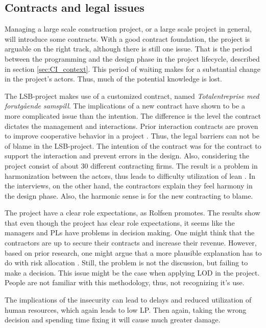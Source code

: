 \subsection{Contracts and legal issues}
Managing a large scale construction project, or a large scale project in general, will introduce some contracts. With a good contract foundation, the project is arguable on the right track, although there is still one issue. That is the period between the programming and the design phase in the project lifecycle, described in section \ref{sec:CI_context}. This period of waiting makes for a substantial change in the project's actors. Thus, much of the potential knowledge is lost. 

The LSB-project makes use of a customized contract, named \textit{Totalentreprise med forutgående samspill}. The implications of a new contract have shown to be a more complicated issue than the intention. The difference is the level the contract dictates the management and interactions. Prior interaction contracts are proven to improve cooperative behavior in a project \cite{wang2017prior}. Thus, the legal barriers can not be of blame in the LSB-project. The intention of the contract was for the contract to support the interaction and prevent errors in the design. Also, considering the project consist of about 30 different contracting firms. The result is a problem in harmonization between the actors, thus leads to difficulty utilization of lean \cite{miller2002harmonization}. In the interviews, on the other hand, the contractors explain they feel harmony in the design phase. Also, the harmonic sense is for the new contracting to blame.
    
The project have a clear role expectations, as Rolfsen promotes\cite{rolfsen}. The results show that even though the project has clear role expectations, it seems like the managers and PLs have problems in decision making. One might think that the contractors are up to secure their contracts and increase their revenue. However, based on prior research, one might argue that a more plausible explanation has to do with risk allocation \cite{zaghloul2003construction}.  Still, the problem is not the discussion, but failing to make a decision. This issue might be the case when applying LOD in the project. People are not familiar with this methodology, thus, not recognizing it's use. 
    
The implications of the insecurity can lead to delays and reduced utilization of human resources, which again leads to low LP. Then again, taking the wrong decision and spending time fixing it will cause much greater damage. 

